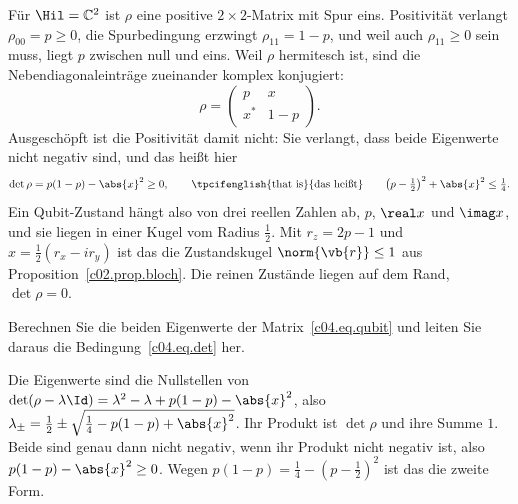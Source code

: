 \begin{example}\label{c04.ex.qubit-zustaende}
  Für $\Hil = \mathbb{C}^2$ ist $\rho$ eine positive $2\times 2$-Matrix mit Spur eins. Positivität
  verlangt $\rho_{00} = p \geq 0$, die Spurbedingung erzwingt $\rho_{11} = 1-p$, und weil auch
  $\rho_{11}\geq 0$ sein muss, liegt $p$ zwischen null und eins. Weil $\rho$ hermitesch ist, sind die
  Nebendiagonaleinträge zueinander komplex konjugiert:
  \begin{equation}\label{c04.eq.qubit}
    \rho = \begin{pmatrix} p & x \\ x^* & 1-p \end{pmatrix} .
  \end{equation}
  Ausgeschöpft ist die Positivität damit nicht: Sie verlangt, dass beide Eigenwerte nicht negativ
  sind, und das heißt hier
  \begin{equation}\label{c04.eq.det}
    \det\rho = p(1-p) - \abs{x}^2 \geq 0 ,
    \qquad \text{\tpcifenglish{that is}{das heißt}} \qquad
    \bigl(p - \tfrac12\bigr)^2 + \abs{x}^2 \leq \tfrac14 .
  \end{equation}
  Ein Qubit-Zustand hängt also von drei reellen Zahlen ab, $p$, $\real x$ und $\imag x$, und sie
  liegen in einer Kugel vom Radius $\tfrac12$. Mit $r_z = 2p - 1$ und $x = \tfrac12(r_x - i r_y)$ ist
  das die Zustandskugel $\norm{\vb{r}} \leq 1$ aus Proposition~\ref{c02.prop.bloch}. Die reinen
  Zustände liegen auf dem Rand, $\det\rho = 0$.
\end{example}

\begin{exercise}\label{c04.exc.eigenwerte}
  Berechnen Sie die beiden Eigenwerte der Matrix~\eqref{c04.eq.qubit} und leiten Sie daraus die
  Bedingung~\eqref{c04.eq.det} her.
\end{exercise}
\begin{solution}
  Die Eigenwerte sind die Nullstellen von
  $\det(\rho - \lambda\Id) = \lambda^2 - \lambda + p(1-p) - \abs{x}^2$, also
  $\lambda_\pm = \tfrac12 \pm \sqrt{\tfrac14 - p(1-p) + \abs{x}^2}$. Ihr Produkt ist $\det\rho$ und
  ihre Summe $1$. Beide sind genau dann nicht negativ, wenn ihr Produkt nicht negativ ist, also
  $p(1-p) - \abs{x}^2 \geq 0$. Wegen $p(1-p) = \tfrac14 - (p - \tfrac12)^2$ ist das die zweite Form.
\end{solution}

